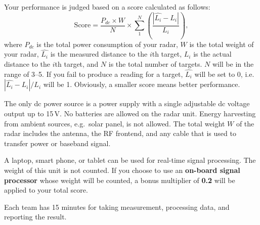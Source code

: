 \documentclass[letterpaper, 11pt]{article}
\begin{document}
Your performance is judged based on a score calculated as follows:
\[
\text{Score} = \frac{P_{dc} \times W}{N} \times \sum_1^N \left( \frac{ \left| \hat{L_i} - L_i \right|}{L_i} \right),
\]
where $P_{dc}$ is the total power consumption of your radar, $W$ is the total weight of your radar, $\hat{L_i}$ is the measured distance to the $i$th target, $L_i$ is the actual distance to the $i$th target, and $N$ is the total number of targets. $N$ will be in the range of 3--5. If you fail to produce a reading for a target, $\hat{L_i}$ will be set to 0, i.e.~$\left| \hat{L_i} - L_i \right|/L_i$ will be 1. Obviously, a smaller score means better performance. 

The only dc power source is a power supply with a single adjustable dc voltage output up to 15\,V. No batteries are allowed on the radar unit. Energy harvesting from ambient sources, e.g.~solar panel, is not allowed. The total weight $W$ of the radar includes the antenna, the RF frontend, and any cable that is used to transfer power or baseband signal.
	
A laptop, smart phone, or tablet can be used for real-time signal processing. The weight of this unit is not counted. If you choose to use an \textbf{on-board signal processor} whose weight will be counted, a bonus multiplier of \textbf{0.2} will be applied to your total score. 

Each team has 15 minutes for taking measurement, processing data, and reporting the result. 
\end{document}
